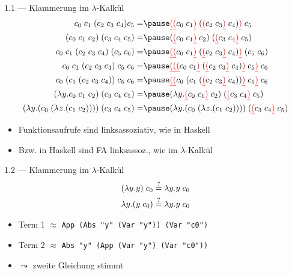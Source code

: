 \documentclass{beamer}
\begin{document}
\begin{frame}{1.1 --- Klammerung im $\lambda$-Kalkül}
	\footnotesize
	\begin{eqnarray}
		\liiin{c_0}{c_1}{\liii{c_2}{c_3}{c_4}}{c_5}                   =& \pause \liin{\liir{\liir{c_0}{c_1}}{\lii{\liir{c_2}{c_3}}{c_4}}}{c_5}             \\
		\liin{\liii{c_0}{c_1}{c_2}}{\liii{c_3}{c_4}{c_5}}             =& \pause \liin{\lii{\liir{c_0}{c_1}}{c_2}}{\lii{\liir{c_3}{c_4}}{c_5}}              \\
		\livn{c_0}{c_1}{\liii{c_2}{c_3}{c_4}}{\lii{c_5}{c_6}}         =& \pause \liin{\liir{\liir{c_0}{c_1}}{\lii{\liir{c_2}{c_3}}{c_4}}}{\lii{c_5}{c_6}}  \\
		\lvn{c_0}{c_1}{\liii{c_2}{c_3}{c_4}}{c_5}{c_6}                =& \pause \liin{\liir{\liir{\liir{c_0}{c_1}}{\lii{\liir{c_2}{c_3}}{c_4}}}{c_5}}{c_6} \\
		\livn{c_0}{\lii{c_1}{\liii{c_2}{c_3}{c_4}}}{c_5}{c_6}         =& \pause \liin{\liir{\liir{c_0}{\lii{c_1}{\lii{\liir{c_2}{c_3}}{c_4}}}}{c_5}}{c_6}  \\
		\liin{(\abs{y}{\liiin{c_0}{c_1}{c_2}})}{\liii{c_3}{c_4}{c_5}} =& \pause \liin{(\abs{y}{\liin{\liir{c_0}{c_1}}{c_2}})}{\lii{\liir{c_3}{c_4}}{c_5}}  \\
                \liin{(\abs{y}{\lii{c_0}{(\abs{z}{\lii{c_1}{c_2}})}})}{\liii{c_3}{c_4}{c_5}} =& \pause \liin{(\abs{y}{\lii{c_0}{(\abs{z}{\lii{c_1}{c_2}})}})}{\lii{\liir{c_3}{c_4}}{c_5}}
	\end{eqnarray}

	\normalsize
	\begin{itemize}
		\item Funktionsaufrufe sind linksassoziativ, wie in Haskell
		\item Bzw. in Haskell sind FA linksassoz., wie im $\lambda$-Kalkül
	\end{itemize}
\end{frame}

\setcounter{equation}{0}

\begin{frame}{1.2 --- Klammerung im $\lambda$-Kalkül}
	\begin{eqnarray}
		(\lambda{}y.y)\;{}c_0 \stackrel{?}{=} \lambda{}y.y\;{}c_0 \\
		\lambda{}y.(y\;{}c_0) \stackrel{?}{=} \lambda{}y.y\;{}c_0
	\end{eqnarray}

	\begin{itemize}
		\item Term 1 $\approx$ \texttt{App (Abs "y" (Var "y")) (Var "c0")}
		\item Term 2 $\approx$ \texttt{Abs "y" (App (Var "y") (Var "c0"))}
		\pause
		\item $\leadsto$ zweite Gleichung stimmt
	\end{itemize}
\end{frame}
\end{document}
